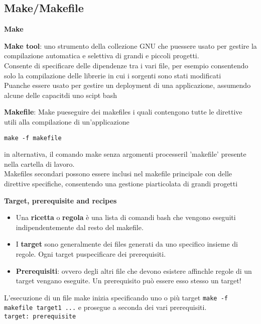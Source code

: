 \subsection{Make/Makefile}
\begin{flushleft}
  \textbf{Make}\par 
  \textbf{Make tool}: \ace uno strumento della collezione GNU che pu\aco essere usato 
  per gestire la compilazione automatica e selettiva di grandi e piccoli progetti. \\
  Consente di specificare delle dipendenze tra i vari file, per esempio consentendo solo 
  la compilazione delle librerie in cui i sorgenti sono stati modificati\\ 
  Pu\aco anche essere usato per gestire un deployment di una applicazione, assumendo 
  alcune delle capacit\aca  di uno scipt bash \par 
  \textbf{Makefile}: Make pu\aco eseguire dei makefiles i quali contengono tutte le direttive 
  utili alla compilazione di un'applicazione 
  \begin{center}
    \texttt{make -f makefile}
  \end{center}
  in alternativa, il comando make senza argomenti processer\aca il 'makefile' presente 
  nella cartella di lavoro. \\ 
  Makefiles secondari possono essere inclusi nel makefile principale con delle 
  direttive specifiche, consentendo una gestione pi\acu articolata di grandi progetti
  \begin{flushleft}
    \textbf{Target, prerequisite and recipes}
    \begin{itemize}
      \item Una \textbf{ricetta} o \textbf{regola} è una lista di comandi bash che 
            vengono eseguiti indipendentemente dal resto del makefile.
      \item I \textbf{target} sono generalmente dei files generati da uno specifico insieme di regole. 
            Ogni target pu\aco specificare dei prerequisiti.
      \item \textbf{Prerequisiti}: ovvero degli altri file che devono esistere affinch\ace le regole di un 
            target vengano eseguite. Un prerequisito può essere esso stesso un target! 
    \end{itemize}
    L'esecuzione di un file make inizia specificando uno o più target 
    \texttt{make -f makefile target1 ...} e prosegue a seconda dei vari prerequisiti.\\
    \texttt{target: prerequisite \\
}
\end{flushleft}
\end{flushleft}
